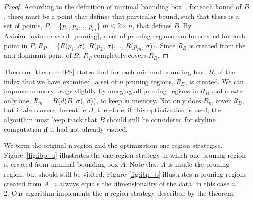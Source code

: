 \begin{proof}
According to the definition of minimal bounding box~\cite{DBLP:journals/gis/PapadiasT97}, for each bound of $B$, there must be a point that defines that particular bound, such that there is a set of points, $P$ = \{$p_1$, $p_2$,.., $p_m$\} $m \leq 2 \times n$, that defines $B$. By Axioim~\ref{axiom:record_pruning}, a set of pruning regions can be created for each point in $P$, $R_P$ = \{$R$($p_1$, $\sigma$), $R$($p_2$, $\sigma$), .., $R$($p_m$, $\sigma$)\}. Since $R_B$ is created from the anti-dominant point of $B$, $R_P$ completely covers $R_B$.
\end{proof}
%
%

Theorem~\ref{theorem:IPS} states that for each minimal bounding box, $B$, of the index that we have examined, a set of $n$ pruning regions, $R_B$, is created. We can improve memory usage slightly by merging all pruning regions in $R_B$ and create only one, $R_m$ = $R$($d$($B$, $\sigma$), $\sigma$)), to keep in memory. Not only does $R_m$ cover $R_B$, but it also covers the entire $B$; therefore, if this optimization is used, the algorithm must keep track that $B$ should still be considered for skyline computation if it had not already visited.

We term the original n-region and the optimization one-region strategies. Figure~\ref{fig:ibp_a} illustrates the one-region strategy in which one pruning region is created from minimal bounding box $A$. Note that $A$ is inside the pruning region, but should still be visited. Figure~\ref{fig:ibp_b} illustrates n-pruning regions created from $A$. $n$ always equals the dimensionality of the data, in this case $n$ = 2. Our algorithm implements the n-region strategy described by the theorem.

